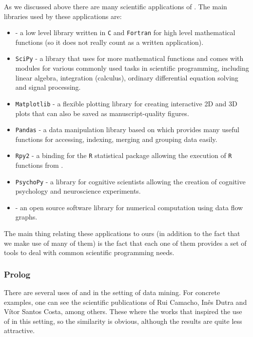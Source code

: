 \documentclass[12pt, openany]{book}
\begin{document}
As we discussed above there are many scientific applications of \python. The main libraries used by these applications are:
\begin{itemize}
\item \numpy \xspace - a low level library written in \texttt{C} and \texttt{Fortran} for high level mathematical functions (so it does not really count as a \python written application).
\item \texttt{SciPy} - a library that uses \numpy for more mathematical functions and comes with modules for various commonly used tasks in scientific programming, including linear algebra, integration (calculus), ordinary differential equation solving and signal processing.
\item \texttt{Matplotlib} - a flexible plotting library for creating interactive 2D and 3D plots that can also be saved as manuscript-quality figures.
\item \texttt{Pandas} - a data manipulation library based on \numpy which provides many useful functions for accessing, indexing, merging and grouping data easily.
\item \texttt{Rpy2} - a \python binding for the \texttt{R} statistical package allowing the execution of \texttt{R} functions from \python.
\item \texttt{PsychoPy} - a library for cognitive scientists allowing the creation of cognitive psychology and neuroscience experiments.
\item \tensorflow \xspace - an open source software library for numerical computation using data flow graphs.
\end{itemize}

The main thing relating these applications to ours (in addition to the fact that we make use of many of them) is the fact that each one of them provides a set of tools to deal with common scientific programming needs.

\subsubsection{Prolog}

There are several uses of \prolog and \alephilp in the setting of data mining. For concrete examples, one can see the scientific publications of Rui Camacho, In\^{e}s Dutra and V\'{i}tor Santos Costa, among others. These where the works that inspired the use of \alephilp in this setting, so the similarity is obvious, although the results are quite less attractive.
\end{document}
